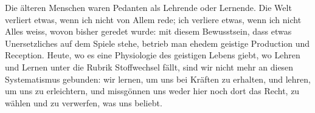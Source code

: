 Die älteren Menschen waren Pedanten als Lehrende oder Lernende. Die Welt verliert etwas, wenn ich nicht von Allem rede; ich verliere etwas, wenn ich nicht Alles weiss, wovon bisher geredet wurde: mit diesem Bewusstsein, dass etwas Unersetzliches auf dem Spiele stehe, betrieb man ehedem geistige Production und Reception. Heute, wo es eine Physiologie des geistigen Lebens giebt, wo Lehren und Lernen unter die Rubrik Stoffwechsel fällt, sind wir nicht mehr an diesen Systematismus gebunden: wir lernen, um uns bei Kräften zu erhalten, und lehren, um uns zu erleichtern, und missgönnen uns weder hier noch dort das Recht, zu wählen und zu verwerfen, was uns beliebt.
\par

